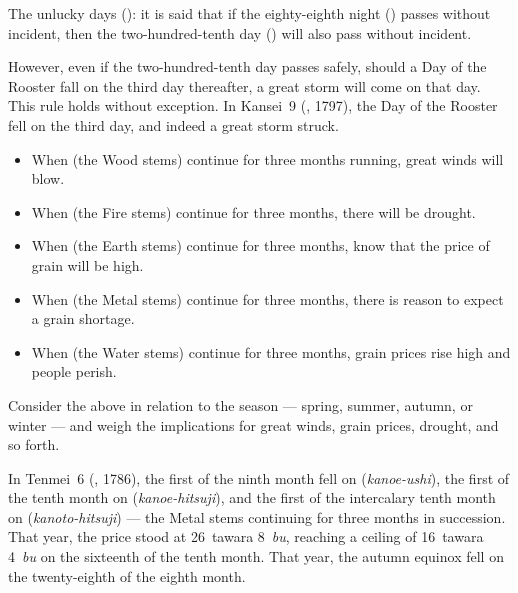 
\begin{sokyubox}
{\small\itshape\color{sokyubar} }

\medskip
The unlucky days (): it is said that if the
eighty-eighth night () passes without
incident, then the two-hundred-tenth day ()
will also pass without incident.

However, even if the two-hundred-tenth day passes safely, should a
Day of the Rooster fall on the third day thereafter, a great storm
will come on that day. This rule holds without exception. In Kansei~9
(, 1797), the Day of the Rooster fell on the third day,
and indeed a great storm struck.
\end{sokyubox}


\begin{sokyubox}
{\small\itshape\color{sokyubar} }

\medskip
\begin{itemize}[nosep]
\item When  (the Wood stems) continue for three months running, great winds will blow.
\item When  (the Fire stems) continue for three months, there will be drought.
\item When  (the Earth stems) continue for three months, know that the price of grain will be high.
\item When  (the Metal stems) continue for three months, there is reason to expect a grain shortage.
\item When  (the Water stems) continue for three months, grain prices rise high and people perish.
\end{itemize}

\medskip
Consider the above in relation to the season --- spring, summer,
autumn, or winter --- and weigh the implications for great winds,
grain prices, drought, and so forth.

In Tenmei~6 (, 1786), the first of the ninth month fell on
 (\textit{kanoe-ushi}), the first of the tenth month on
 (\textit{kanoe-hitsuji}), and the first of the intercalary tenth
month on  (\textit{kanoto-hitsuji}) --- the Metal stems continuing
for three months in succession. That year, the price stood at
26~tawara 8~\textit{bu}, reaching a ceiling of 16~tawara 4~\textit{bu} on the
sixteenth of the tenth month. That year, the autumn equinox fell on
the twenty-eighth of the eighth month.
\end{sokyubox}

